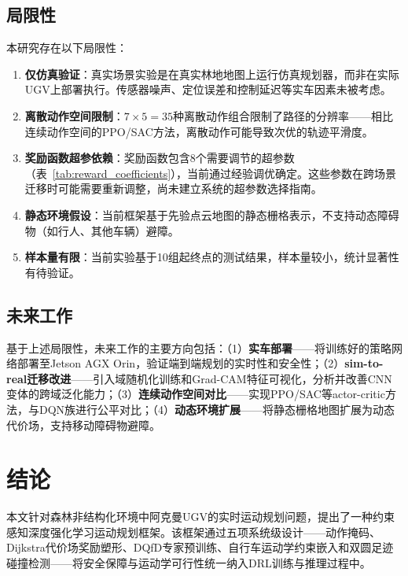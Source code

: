 \documentclass[twocolumn]{elsarticle}
\begin{document}
\subsection{局限性}

本研究存在以下局限性：

\begin{enumerate}
  \item \textbf{仅仿真验证}：真实场景实验是在真实林地地图上运行仿真规划器，而非在实际UGV上部署执行。传感器噪声、定位误差和控制延迟等实车因素未被考虑。
  \item \textbf{离散动作空间限制}：$7\times5=35$种离散动作组合限制了路径的分辨率——相比连续动作空间的PPO/SAC方法，离散动作可能导致次优的轨迹平滑度。
  \item \textbf{奖励函数超参依赖}：奖励函数包含8个需要调节的超参数（表~\ref{tab:reward_coefficients}），当前通过经验调优确定。这些参数在跨场景迁移时可能需要重新调整，尚未建立系统的超参数选择指南。
  \item \textbf{静态环境假设}：当前框架基于先验点云地图的静态栅格表示，不支持动态障碍物（如行人、其他车辆）避障。
  \item \textbf{样本量有限}：当前实验基于10组起终点的测试结果，样本量较小，统计显著性有待验证。
\end{enumerate}

\subsection{未来工作}

基于上述局限性，未来工作的主要方向包括：（1）\textbf{实车部署}——将训练好的策略网络部署至Jetson AGX Orin，验证端到端规划的实时性和安全性；（2）\textbf{sim-to-real迁移改进}——引入域随机化训练和Grad-CAM特征可视化，分析并改善CNN变体的跨域泛化能力；（3）\textbf{连续动作空间对比}——实现PPO/SAC等actor-critic方法，与DQN族进行公平对比；（4）\textbf{动态环境扩展}——将静态栅格地图扩展为动态代价场，支持移动障碍物避障。

\section{结论}\label{sec:conclusion}

本文针对森林非结构化环境中阿克曼UGV的实时运动规划问题，提出了一种约束感知深度强化学习运动规划框架。该框架通过五项系统级设计——动作掩码、Dijkstra代价场奖励塑形、DQfD专家预训练、自行车运动学约束嵌入和双圆足迹碰撞检测——将安全保障与运动学可行性统一纳入DRL训练与推理过程中。
\end{document}
